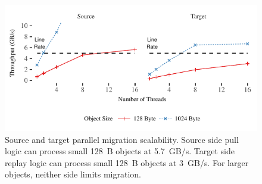 \begin{figure}[t]
\centering
\includegraphics[width=1.0\columnwidth]{graphs/rocksteady-scalability.pdf}
\caption{Source and target parallel migration scalability. Source side
pull logic can process small 128~B objects at 5.7~GB/s. Target side
replay logic can process small 128~B objects at 3~GB/s. For larger
objects, neither side limits migration.}
\label{fig:parallel-replay}
\end{figure}
